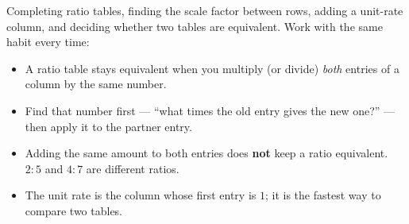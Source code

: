\documentclass[12pt]{article}
\begin{document}

\noindent\small
Completing ratio tables, finding the scale factor between rows, adding a
unit-rate column, and deciding whether two tables are equivalent. Work with
the same habit every time:
\begin{itemize}[leftmargin=1.1cm, itemsep=1pt, topsep=2pt]
  \item A ratio table stays equivalent when you multiply (or divide)
        \emph{both} entries of a column by the same number.
  \item Find that number first --- ``what times the old entry gives the new
        one?'' --- then apply it to the partner entry.
  \item Adding the same amount to both entries does \textbf{not} keep a ratio
        equivalent. $2:5$ and $4:7$ are different ratios.
  \item The unit rate is the column whose first entry is $1$; it is the fastest
        way to compare two tables.
\end{itemize}
\normalsize

\vspace{0.15cm}


\end{document}
